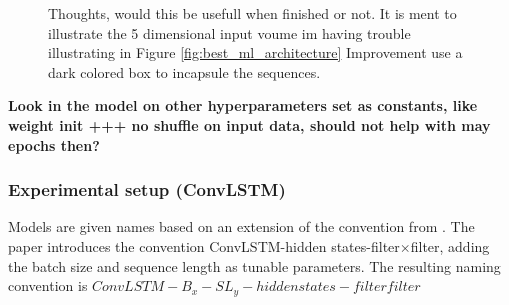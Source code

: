 \begin{figure}
    \centering
    
    \caption{Thoughts, would this be usefull when finished or not. It is ment to illustrate the 5 dimensional input voume im having trouble illustrating in Figure \ref{fig:best_ml_architecture} Improvement use a dark colored box to incapsule the sequences.}
    \label{fig:input_volume_conv_lstm}
\end{figure}


\textbf{Look in the model on other hyperparameters set as constants, like weight init +++ no shuffle on input data, should not help with may epochs then?}

\subsubsection{Experimental setup (ConvLSTM)}
Models are given names based on an extension of the convention from . The paper introduces the convention ConvLSTM-hidden states-filter$\times$filter, adding the batch size and sequence length as tunable parameters. The resulting naming convention is \newline $ConvLSTM-B_{x}-SL_{y}-hidden states-filter$\times$filter$

\begin{table}[hp]
    \centering
    \caption{Give three examples to simplify the explanation of configurations and models.}
    \label{tab:convlstm_config}
\end{table}

